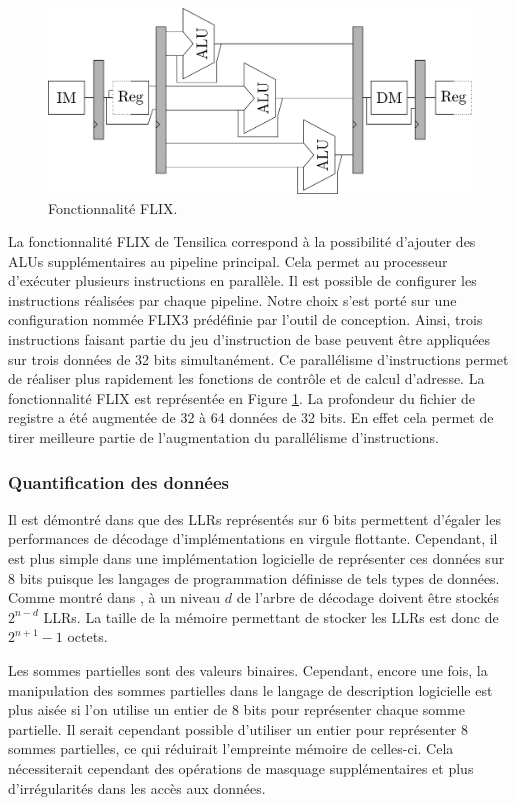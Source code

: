 \begin{figure}
\centering
\includegraphics[width=\textwidth]{main/ch3_fig/flix}
\caption{Fonctionnalité FLIX.}
\label{fig:flix}
\end{figure}

La fonctionnalité FLIX de Tensilica correspond à la possibilité d'ajouter des ALUs supplémentaires au pipeline principal. Cela permet au processeur d'exécuter plusieurs instructions en parallèle. Il est possible de configurer les instructions réalisées par chaque pipeline. Notre choix s'est porté sur une configuration nommée FLIX3 prédéfinie par l'outil de conception. Ainsi, trois instructions faisant partie du jeu d'instruction de base peuvent être appliquées sur trois données de 32 bits simultanément. Ce parallélisme d'instructions permet de réaliser plus rapidement les fonctions de contrôle et de calcul d'adresse. La fonctionnalité FLIX est représentée en Figure \ref{fig:flix}.
La profondeur du fichier de registre a été augmentée de 32 à 64 données de 32 bits. En effet cela permet de tirer meilleure partie de l'augmentation du parallélisme d'instructions.

\subsubsection{Quantification des données}
Il est démontré dans \cite{sarkis_fast_2014} que des LLRs représentés sur 6 bits permettent d'égaler les performances de décodage d'implémentations en virgule flottante. Cependant, il est plus simple dans une implémentation logicielle de représenter ces données sur 8 bits puisque les langages de programmation définisse de tels types de données. Comme montré dans \cite{leroux_hardware_2011}, à un niveau $d$ de l'arbre de décodage doivent être stockés $2^{n-d}$ LLRs. La taille de la mémoire permettant de stocker les LLRs est donc de $2^{n+1}-1$ octets.

Les sommes partielles sont des valeurs binaires. Cependant, encore une fois, la manipulation des sommes partielles dans le langage de description logicielle est plus aisée si l'on utilise un entier de 8 bits pour représenter chaque somme partielle. Il serait cependant possible d'utiliser un entier pour représenter 8 sommes partielles, ce qui réduirait l'empreinte mémoire de celles-ci. Cela nécessiterait cependant des opérations de masquage supplémentaires et plus d'irrégularités dans les accès aux données.

